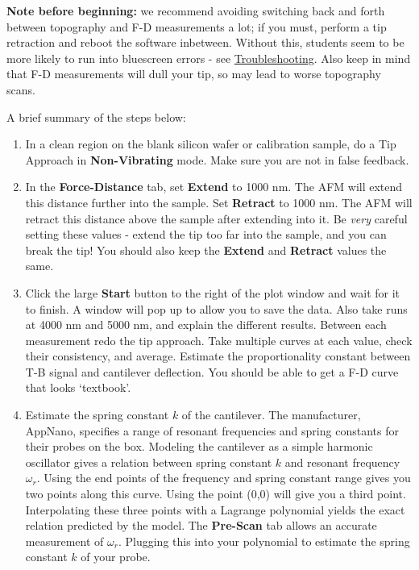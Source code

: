 \documentclass{../lab}
\begin{document}
\textbf{Note before beginning:} we recommend avoiding switching back and forth between topography and F-D measurements a lot; if you must, perform a tip retraction and reboot the software inbetween. Without this, students seem to be more likely to run into bluescreen errors - see \hyperref[sec:Troubleshooting]{Troubleshooting}. Also keep in mind that F-D measurements will dull your tip, so may lead to worse topography scans.

A brief summary of the steps below:

\begin{enumerate}
    \item In a clean region on the blank silicon wafer or calibration sample, do a Tip Approach in \textbf{Non-Vibrating} mode. Make sure you are not in false feedback. 

    \item In the \textbf{Force-Distance} tab, set \textbf{Extend} to 1000 nm. The AFM will extend this distance further into the sample. Set \textbf{Retract} to 1000 nm. The AFM will retract this distance above the sample after extending into it. Be \textit{very} careful setting these values - extend the tip too far into the sample, and you can break the tip! You should also keep the \textbf{Extend} and \textbf{Retract} values the same. %
    
    \item Click the large \textbf{Start} button to the right of the plot window and wait for it to finish. A window will pop up to allow you to save the data. Also take runs at 4000 nm and 5000 nm, and explain the different results. Between each measurement redo the tip approach. Take multiple curves at each value, check their consistency, and average. Estimate the proportionality constant between T-B signal and cantilever deflection. You should be able to get a F-D curve that looks `textbook'.
        
    \item Estimate the spring constant $k$ of the cantilever. The manufacturer, AppNano, specifies a range of resonant frequencies and spring constants for their probes on the box. Modeling the cantilever as a simple harmonic oscillator gives a relation between spring constant $k$ and resonant frequency $\omega_r$. Using the end points of the frequency and spring constant range gives you two points along this curve. Using the point (0,0) will give you a third point. Interpolating these three points with a Lagrange polynomial yields the exact relation predicted by the model. The \textbf{Pre-Scan} tab allows an accurate measurement of $\omega_r$. Plugging this into your polynomial to estimate the spring constant $k$ of your probe.


\end{enumerate}
\end{document}
